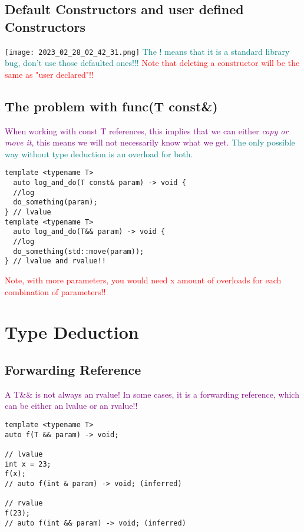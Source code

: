 \documentclass[main.tex,fontsize=8pt,paper=a4,paper=portrait,DIV=calc,]{scrartcl}
\begin{document}
\subsection{Default Constructors and user defined Constructors}
\texttt{[image: 2023\_02\_28\_02\_42\_31.png]}\newline
\textcolor{teal}{The ! means that it is a standard library bug, don't use those defaulted ones!!!}\newline
\textcolor{red}{Note that deleting a constructor will be the same as "user declared"!!}

\subsection{The problem with func(T const\&)}
\textcolor{purple}{When working with const T references, this implies that we can either \emph{copy or move it}, this means we will not necessarily know what we get.}\newline
\textcolor{teal}{The only possible way without type deduction is an overload for both.}
\begin{lstlisting}
template <typename T>
  auto log_and_do(T const& param) -> void {
  //log
  do_something(param);
} // lvalue 
template <typename T>
  auto log_and_do(T&& param) -> void {
  //log
  do_something(std::move(param));
} // lvalue and rvalue!!
\end{lstlisting}
\textcolor{red}{Note, with more parameters, you would need x amount of overloads for each combination of parameters!!}

\section{Type Deduction}

\subsection{Forwarding Reference}
\textcolor{purple}{A T\&\& is not always an rvalue! In some cases, it is a forwarding reference, which can be either an lvalue or an rvalue!!}\newline
\begin{lstlisting}
template <typename T>
auto f(T && param) -> void;

// lvalue
int x = 23;
f(x);
// auto f(int & param) -> void; (inferred)

// rvalue
f(23);
// auto f(int && param) -> void; (inferred)
\end{lstlisting}
\end{document}
